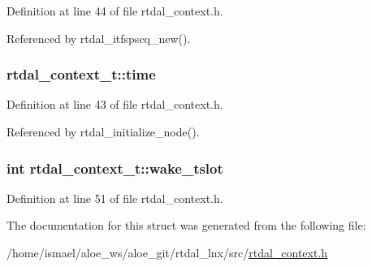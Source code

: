 Definition at line 44 of file rtdal\-\_\-context.\-h.



Referenced by rtdal\-\_\-itfspscq\-\_\-new().

\hypertarget{structrtdal__context__t_a8b7974854cfddeeb16a0b687124a8d34}{
\subsubsection[{time}]{ rtdal\-\_\-context\-\_\-t\-::time}}\label{structrtdal__context__t_a8b7974854cfddeeb16a0b687124a8d34}


Definition at line 43 of file rtdal\-\_\-context.\-h.



Referenced by rtdal\-\_\-initialize\-\_\-node().

\hypertarget{structrtdal__context__t_abfb7860ff2fbfc31358676c27ec2fbce}{
\subsubsection[{wake\-\_\-tslot}]{\setlength{\rightskip}{0pt plus 5cm}int rtdal\-\_\-context\-\_\-t\-::wake\-\_\-tslot}}\label{structrtdal__context__t_abfb7860ff2fbfc31358676c27ec2fbce}


Definition at line 51 of file rtdal\-\_\-context.\-h.



The documentation for this struct was generated from the following file\-:\begin{DoxyCompactItemize}
\item 
/home/ismael/aloe\-\_\-ws/aloe\-\_\-git/rtdal\-\_\-lnx/src/\hyperlink{rtdal__context_8h}{rtdal\-\_\-context.\-h}\end{DoxyCompactItemize}
